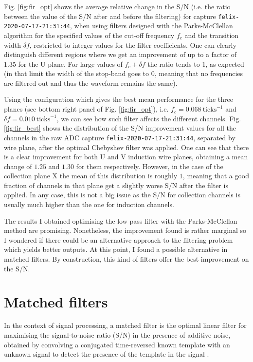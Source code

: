 Fig. \ref{fig:fir_opt} shows the average relative change in the S/N (i.e. the ratio between the value of the S/N after and before the filtering) for capture \texttt{felix-2020-07-17-21:31:44}, when using filters designed with the Parks-McClellan algorithm for the specified values of the cut-off frequency $f_{c}$ and the transition width $\delta f$, restricted to integer values for the filter coefficients. One can clearly distinguish different regions where we get an improvement of up to a factor of $1.35$ for the U plane. For large values of $f_{c} + \delta f$ the ratio tends to $1$, as expected (in that limit the width of the stop-band goes to $0$, meaning that no frequencies are filtered out and thus the waveform remains the same).

Using the configuration which gives the best mean performance for the three planes (see bottom right panel of Fig. \ref{fig:fir_opt}), i.e. $f_{c} = 0.068 \ \mathrm{ticks}^{-1}$ and $\delta f = 0.010 \ \mathrm{ticks}^{-1}$, we can see how such filter affects the different channels. Fig. \ref{fig:fir_best} shows the distribution of the S/N improvement values for all the channels in the raw ADC capture \texttt{felix-2020-07-17-21:31:44}, separated by wire plane, after the optimal Chebyshev filter was applied. One can see that there is a clear improvement for both U and V induction wire planes, obtaining a mean change of $1.25$ and $1.30$ for them respectively. However, in the case of the collection plane X the mean of this distribution is roughly $1$, meaning that a good fraction of channels in that plane get a slightly worse S/N after the filter is applied. In any case, this is not a big issue as the S/N for collection channels is usually much higher than the one for induction channels.

The results I obtained optimising the low pass filter with the Parks-McClellan method are promising. Nonetheless, the improvement found is rather marginal so I wondered if there could be an alternative approach to the filtering problem which yields better outputs. At this point, I found a possible alternative in matched filters. By construction, this kind of filters offer the best improvement on the S/N.

\section{Matched filters}
\label{sec:matched_filter_matched_filter}

In the context of signal processing, a matched filter is the optimal linear filter for maximising the signal-to-noise ratio (S/N) in the presence of additive noise, obtained by convolving a conjugated time-reversed known template with an unknown signal to detect the presence of the template in the signal \cite{Turin1960}.

